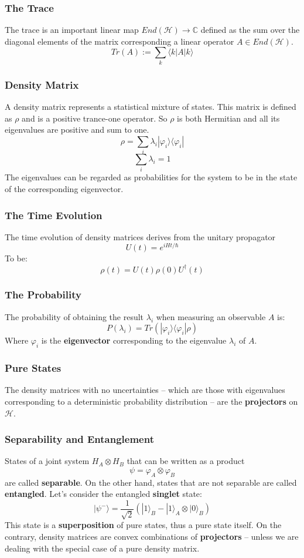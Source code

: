 \documentclass{article}
\begin{document}
\subsubsection{The Trace}
The trace is an important linear map $End(\mathcal{H}) \rightarrow \mathbb{C}$ defined as the sum over the diagonal elements of the matrix corresponding a linear operator $A \in End(\mathcal{H})$.
\[ Tr(A) := \sum_k \langle k|A|k\rangle \]

\subsubsection{Density Matrix}
A density matrix represents a statistical mixture of states. This matrix is defined as $\rho$ and is a positive trance-one operator. So $\rho$ is both Hermitian and all its eigenvalues are positive and sum to one.
\[ \rho = \sum_i \lambda_i |\varphi_i\rangle \langle \varphi_i| \]
\[ \sum_i \lambda_i = 1 \]
The eigenvalues can be regarded as probabilities for the system to be in the state of the corresponding eigenvector.

\subsubsection{The Time Evolution}
The time evolution of density matrices derives from the unitary propagator
\[ U(t) = e^{iHt/\hbar} \]
To be:
\[ \rho(t) = U(t)\rho(0)U^\dagger(t) \]

\subsubsection{The Probability}
The probability of obtaining the result $\lambda_i$ when measuring an observable $A$ is:
\[ P(\lambda_i) = Tr(|\varphi_i\rangle \langle\varphi_i|\rho) \]
Where $\varphi_i$ is the \textbf{eigenvector} corresponding to the eigenvalue $\lambda_i$ of $A$.

\subsubsection{Pure States}
The density matrices with no uncertainties -- which are those with eigenvalues corresponding to a deterministic probability distribution -- are the \textbf{projectors} on $\mathcal{H}$.

\subsubsection{Separability and Entanglement}
States of a joint system $H_A \otimes H_B$ that can be written as a product
\[ \psi = \varphi_A \otimes \varphi_B \]
are called \textbf{separable}. On the other hand, states that are not separable are called \textbf{entangled}. Let's consider the entangled \textbf{singlet} state:
\[ | \psi^- \rangle = \displaystyle\frac{1}{\sqrt{2}} (| 1 \rangle_B - | 1 \rangle_A \otimes | 0 \rangle_B) \]
This state is a \textbf{superposition} of pure states, thus a pure state itself. On the contrary, density matrices are convex combinations of \textbf{projectors} -- unless we are dealing with the special case of a pure density matrix.
\end{document}
